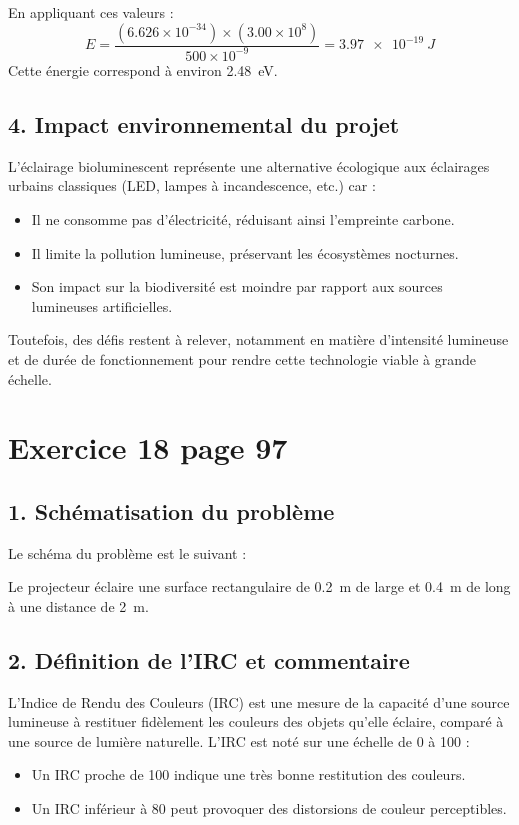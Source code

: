 \documentclass[a4paper,11pt]{article}
\begin{document}
En appliquant ces valeurs :
\begin{equation}
    E = \frac{(6.626 \times 10^{-34}) \times (3.00 \times 10^8)}{500 \times 10^{-9}}
    = \SI{3.97e-19}{J}
\end{equation}
Cette énergie correspond à environ \SI{2.48}{eV}.

\subsection*{4. Impact environnemental du projet}
L’éclairage bioluminescent représente une alternative écologique aux éclairages urbains classiques (LED, lampes à incandescence, etc.) car :
\begin{itemize}
    \item Il ne consomme pas d’électricité, réduisant ainsi l’empreinte carbone.
    \item Il limite la pollution lumineuse, préservant les écosystèmes nocturnes.
    \item Son impact sur la biodiversité est moindre par rapport aux sources lumineuses artificielles.
\end{itemize}
Toutefois, des défis restent à relever, notamment en matière d’intensité lumineuse et de durée de fonctionnement pour rendre cette technologie viable à grande échelle.


\section*{Exercice 18 page 97}

\subsection*{1. Schématisation du problème}
Le schéma du problème est le suivant :

Le projecteur éclaire une surface rectangulaire de \SI{0.2}{m} de large et \SI{0.4}{m} de long à une distance de \SI{2}{m}.

\subsection*{2. Définition de l'IRC et commentaire}
L'Indice de Rendu des Couleurs (IRC) est une mesure de la capacité d'une source lumineuse à restituer fidèlement les couleurs des objets qu'elle éclaire, comparé à une source de lumière naturelle. L'IRC est noté sur une échelle de 0 à 100 :

\begin{itemize}
    \item Un IRC proche de 100 indique une très bonne restitution des couleurs.
    \item Un IRC inférieur à 80 peut provoquer des distorsions de couleur perceptibles.
\end{itemize}
\end{document}
